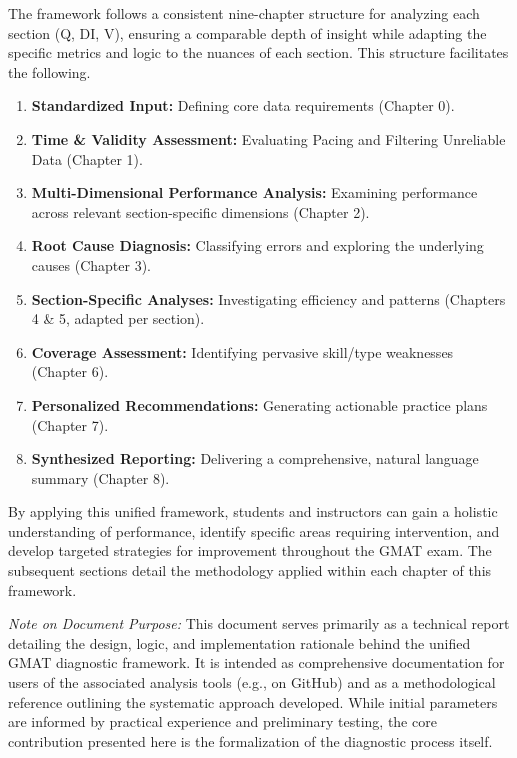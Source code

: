 \documentclass{article}
\begin{document}
The framework follows a consistent nine-chapter structure for analyzing each section (Q, DI, V), ensuring a comparable depth of insight while adapting the specific metrics and logic to the nuances of each section. This structure facilitates the following.

\begin{enumerate}
    \item \textbf{Standardized Input:} Defining core data requirements (Chapter 0).
    \item \textbf{Time \& Validity Assessment:} Evaluating Pacing and Filtering Unreliable Data (Chapter 1).
    \item \textbf{Multi-Dimensional Performance Analysis:} Examining performance across relevant section-specific dimensions (Chapter 2).
    \item \textbf{Root Cause Diagnosis:} Classifying errors and exploring the underlying causes (Chapter 3).
    \item \textbf{Section-Specific Analyses:} Investigating efficiency and patterns (Chapters 4 \& 5, adapted per section).
    \item \textbf{Coverage Assessment:} Identifying pervasive skill/type weaknesses (Chapter 6).
    \item \textbf{Personalized Recommendations:} Generating actionable practice plans (Chapter 7).
    \item \textbf{Synthesized Reporting:} Delivering a comprehensive, natural language summary (Chapter 8).
\end{enumerate}

By applying this unified framework, students and instructors can gain a holistic understanding of performance, identify specific areas requiring intervention, and develop targeted strategies for improvement throughout the GMAT exam. The subsequent sections detail the methodology applied within each chapter of this framework.

\textit{Note on Document Purpose:} This document serves primarily as a technical report detailing the design, logic, and implementation rationale behind the unified GMAT diagnostic framework. It is intended as comprehensive documentation for users of the associated analysis tools (e.g., on GitHub) and as a methodological reference outlining the systematic approach developed. While initial parameters are informed by practical experience and preliminary testing, the core contribution presented here is the formalization of the diagnostic process itself.
\end{document}
